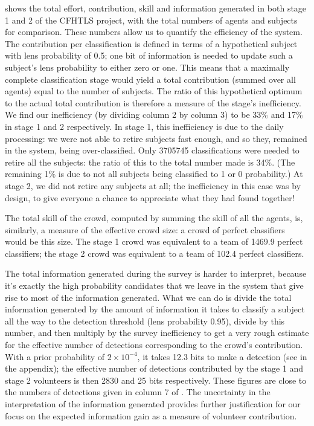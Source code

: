\documentclass[useAMS,usenatbib,a4paper]{mn2e}
\begin{document}
 shows the total effort, contribution, skill and
information generated in both stage 1 and 2 of the CFHTLS project, with the
total numbers of agents and subjects for comparison. These numbers allow us to
quantify the efficiency of the system. The contribution per classification is
defined in terms of a hypothetical subject with lens probability of 0.5; one
bit of information is needed to update such a subject's lens probability to
either zero or one. This means that a maximally complete classification stage
would yield a total contribution (summed over all agents) equal to the number
of subjects. The ratio of this hypothetical optimum to the actual total
contribution is therefore a measure of the stage's inefficiency. We find our
inefficiency (by dividing column 2 by column 3) to be 33\% and 17\% in stage 1
and 2 respectively. In stage 1, this inefficiency is due to the daily
processing: we were not able to retire subjects fast enough, and so they,
remained in the system, being over-classified. Only 3705745 classifications
were needed to retire all the subjects: the ratio of this to the total number
made is 34\%. (The remaining 1\% is due to not all subjects being classified
to 1 or 0 probability.) At stage 2, we did not retire any subjects at all; the
inefficiency in this case was by design, to give everyone a chance to
appreciate what they had found together! 

The total skill of the crowd, computed by summing the skill of all the agents,
is, similarly, a measure of the effective crowd size: a crowd of perfect
classifiers would be this size. The stage 1 crowd was equivalent to a team of
1469.9 perfect classifiers; the stage 2 crowd was equivalent to a team of
102.4 perfect classifiers. 

The total information generated during the survey is harder to interpret,
because it's exactly the high probability candidates that we leave in the
system that give rise to most of the information generated. What we can do is
divide the total information generated by the amount of information it takes
to classify a \sw subject all the way to the detection threshold (lens
probability 0.95), divide by this number, and then multiply by the survey
inefficiency to get a very rough estimate for the effective number of
detections corresponding to the crowd's contribution. With a prior probability
of $2\times10^{-4}$, it takes 12.3 bits to make a detection (see
 in the appendix); the effective
number of detections contributed by the stage 1 and stage 2 volunteers is then
2830 and 25 bits respectively. 
These figures are close to the numbers of detections
given in column 7 of . 
The uncertainty in the interpretation of the
information generated provides further justification for our focus on the
expected information gain as a measure of volunteer contribution.
\end{document}
